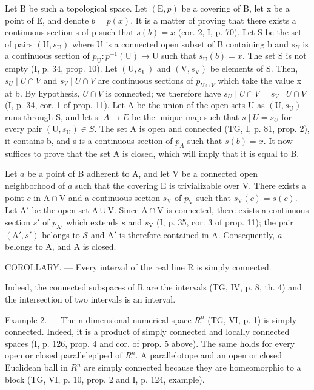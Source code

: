 Let B be such a topological space. Let \((\mathrm{E}, p)\) be a covering of B, let x be a point of E, and denote \(b = p(x)\). It is a matter of proving that there exists a continuous section s of p such that \(s(b) = x\) (cor. 2, I, p. 70). Let S be the set of pairs \((\mathrm{U}, s_{\mathrm{U}})\) where U is a connected open subset of B containing b and \(s_{U}\) is a continuous section of \(p_{\mathrm{U}}: p^{-1}(\mathrm{U}) \to \mathrm{U}\) such that \(s_{\mathrm{U}}(b) = x\). The set S is not empty (I, p. 34, prop. 10). Let \((\mathrm{U}, s_{\mathrm{U}})\) and \((\mathrm{V}, s_{\mathrm{V}})\) be elements of S. Then, \(s_{U} \mid U \cap V\) and \(s_{V} \mid U \cap V\) are continuous sections of \(p_{U \cap V}\) which take the value x at b. By hypothesis, \(U \cap V\) is connected; we therefore have \(s_{U} \mid U \cap V = s_{V} \mid U \cap V\) (I, p. 34, cor. 1 of prop. 11). Let A be the union of the open sets U as \((\mathrm{U}, s_{\mathrm{U}})\) runs through S, and let s: \(A \to E\) be the unique map such that \(s \mid U = s_{U}\) for every pair \((\mathrm{U}, s_{\mathrm{U}}) \in S\). The set A is open and connected (TG, I, p. 81, prop. 2), it contains b, and s is a continuous section of \(p_{A}\) such that \(s(b) = x\). It now suffices to prove that the set A is closed, which will imply that it is equal to B.

Let \(a\) be a point of B adherent to A, and let V be a connected open neighborhood of \(a\) such that the covering E is trivializable over V. There exists a point \(c\) in \(\mathrm{A} \cap \mathrm{V}\) and a continuous section \(s_{\mathrm{V}}\) of \(p_{\mathrm{V}}\) such that \(s_{\mathrm{V}}(c) = s(c)\). Let \(\mathrm{A}'\) be the open set \(\mathrm{A} \cup \mathrm{V}\). Since \(\mathrm{A} \cap \mathrm{V}\) is connected, there exists a continuous section \(s'\) of \(p_{\mathrm{A}'}\) which extends \(s\) and \(s_{\mathrm{V}}\) (I, p. 35, cor. 3 of prop. 11); the pair \((\mathrm{A}', s')\) belongs to \(\mathcal{S}\) and \(\mathrm{A}'\) is therefore contained in A. Consequently, \(a\) belongs to A, and A is closed.

COROLLARY. --- Every interval of the real line R is simply connected.

Indeed, the connected subspaces of R are the intervals (TG, IV, p. 8, th. 4) and the intersection of two intervals is an interval.

Example 2. --- The n-dimensional numerical space \(R^{n}\) (TG, VI, p. 1) is simply connected. Indeed, it is a product of simply connected and locally connected spaces (I, p. 126, prop. 4 and cor. of prop. 5 above). The same holds for every open or closed parallelepiped of \(R^{n}\). A parallelotope and an open or closed Euclidean ball in \(R^{n}\) are simply connected because they are homeomorphic to a block (TG, VI, p. 10, prop. 2 and I, p. 124, example).

